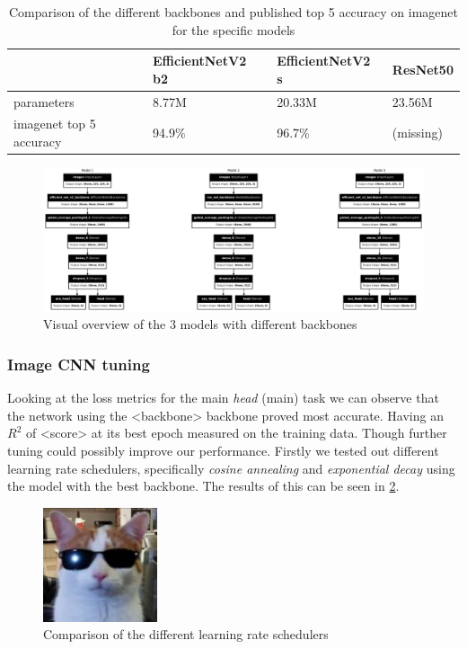 \documentclass[12pt,a4paper,oneside]{article}
\begin{document}
\begin{table}[!h]
    
    \centering
    \begin{tabular}{@{}llll@{}}
    \toprule
    & EfficientNetV2 b2 & EfficientNetV2 s & ResNet50 \\ \midrule
    parameters              & 8.77M             & 20.33M           & 23.56M   \\
    imagenet top 5 accuracy & 94.9\%            & 96.7\%           & (missing)       \\ \bottomrule
\end{tabular}
\caption{Comparison of the different backbones and published top 5 accuracy on imagenet for the specific models}
\label{tab:backbone_comparison}
\end{table}

\begin{figure}[!h]
    \centering
    \includegraphics[width=1\textwidth]{assets/different_models.png}
    \caption{Visual overview of the 3 models with different backbones}
    \label{fig:models_overview}
\end{figure}

\subsubsection{Image CNN tuning}

Looking at the loss metrics for the main \textit{head} (main) task we can observe that the network using the <backbone> backbone proved most accurate. Having an $R^2$ of <score> at its best epoch measured on the training data. Though further tuning could possibly improve our performance. Firstly we tested out different learning rate schedulers, specifically \textit{cosine annealing} \cite{cosineannealing} and \textit{exponential decay} using the model with the best backbone. The results of this can be seen in \ref{fig:lr_schedulers}.

\begin{figure}[!h]
    \centering
    \includegraphics[width=0.3\textwidth]{assets/sample_image.jpeg}
    \caption{Comparison of the different learning rate schedulers}
    \label{fig:lr_schedulers}
\end{figure}
\end{document}
